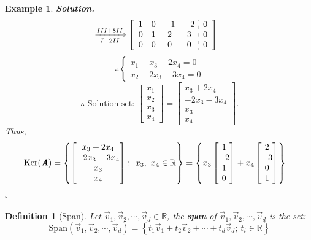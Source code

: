 \documentclass[12pt, a4paper]{article}
\newtheorem{df}{Definition}[subsection]
\newtheorem{eg}{Example}[subsection]
\newenvironment*{sol}{\indent\textbf{Solution. }}{\hfill{$\square$}\par}
\def\R{{\mathbb{R}}}
\def\Span{\mathrm{Span}}
\def\Ker{\mathrm{Ker}}
\def\vecv{\vec{v}}
\def\matrixA{\textbf{\emph{A}}}
\begin{document}
\begin{eg}
\begin{sol}
$$\begin{aligned}
			&\xrightarrow[I-2II]{III+8II}\left[\begin{array}{c:c}\begin{matrix}1&0&-1&-2\\0&1&2&3\\0&0&0&0\end{matrix}&\begin{matrix}0\\0\\0\end{matrix}\end{array}\right]
		\end{aligned}$$
		\[\therefore\begin{cases}x_1-x_3-2x_4=0\\x_2+2x_3+3x_4=0\end{cases}\]
		$$\therefore\text{ Solution set: }\begin{bmatrix}x_1\\x_2\\x_3\\x_4\end{bmatrix}=\begin{bmatrix}x_3+2x_4\\-2x_3-3x_4\\x_3\\x_4\end{bmatrix}.$$
		Thus, $$\begin{aligned}\Ker(\matrixA)&=\left\{\begin{bmatrix}x_3+2x_4\\-2x_3-3x_4\\x_3\\x_4\end{bmatrix}:\ x_3,\ x_4\in\R\right\}=\left\{x_3\begin{bmatrix}1\\-2\\1\\0\end{bmatrix}+x_4\begin{bmatrix}2\\-3\\0\\1\end{bmatrix}\right\}\end{aligned}$$
	\end{sol}
\end{eg}
\begin{df}[Span]
	Let $\vecv_1,\vecv_2,\cdots,\vecv_d\in\R$, the \textbf{span} of $\vecv_1,\vecv_2,\cdots,\vecv_d$ is the set: 
	\[\Span(\vecv_1,\vecv_2,\cdots,\vecv_d)=\left\{t_1\vecv_1+t_2\vecv_2+\cdots+t_d\vecv_d;\  t_i\in\R\right\}\]
\end{df}
\end{document}
